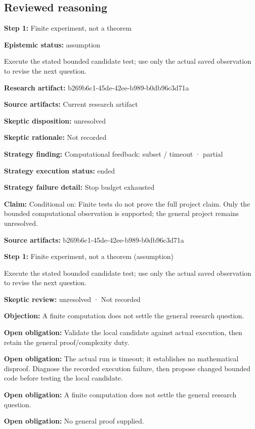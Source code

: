 \documentclass[11pt]{article}
\begin{document}
\subsection{Reviewed reasoning}
\textbf{Step 1:} Finite experiment, not a theorem\par
\textbf{Epistemic status:} assumption\par
Execute the stated bounded candidate test; use only the actual saved observation to revise the next question.\par
\textbf{Research artifact:} b269b6c1-45de-42ee-b989-b0db96c3d71a\par
\textbf{Source artifacts:} Current research artifact\par
\textbf{Skeptic disposition:} unresolved\par
\textbf{Skeptic rationale:} Not recorded\par
\textbf{Strategy finding:} Computational feedback: subset / timeout · partial\par
\textbf{Strategy execution status:} ended\par
\textbf{Strategy failure detail:} Stop budget exhausted\par
\textbf{Claim:} Conditional on: Finite tests do not prove the full project claim. Only the bounded computational observation is supported; the general project remains unresolved.\par
\textbf{Source artifacts:} b269b6c1-45de-42ee-b989-b0db96c3d71a\par
\textbf{Step 1:} Finite experiment, not a theorem (assumption)\par
Execute the stated bounded candidate test; use only the actual saved observation to revise the next question.\par
\textbf{Skeptic review:} unresolved · Not recorded\par
\textbf{Objection:} A finite computation does not settle the general research question.\par
\textbf{Open obligation:} Validate the local candidate against actual execution, then retain the general proof/complexity duty.\par
\textbf{Open obligation:} The actual run is timeout; it establishes no mathematical disproof. Diagnose the recorded execution failure, then propose changed bounded code before testing the local candidate.\par
\textbf{Open obligation:} A finite computation does not settle the general research question.\par
\textbf{Open obligation:} No general proof supplied.\par
\end{document}
